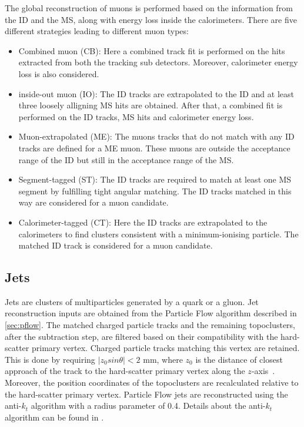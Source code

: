 The global reconstruction of muons is performed based on the information from the ID and the MS, along
with energy loss inside the calorimeters. There are five different strategies leading to different
muon types:
\begin{itemize}
    \item Combined muon (CB): Here a combined track fit is performed on the hits extracted from both
    the tracking sub detectors. Moreover, calorimeter energy loss is also considered. 
    \item inside-out muon (IO): The ID tracks are extrapolated to the ID and at least three loosely
    alligning MS hits are obtained. After that, a combined fit is performed on the ID tracks, MS hits
    and calorimeter energy loss. 
    \item Muon-extrapolated (ME): The muons tracks that do not match with any ID tracks are defined for
    a ME muon. These muons are outside the acceptance range of the ID but still in the acceptance range of the
    MS. 
    \item Segment-tagged (ST): The ID tracks are required to match at least one MS segment by fulfilling
    tight angular matching. The ID tracks matched in this way are considered for a muon candidate.
    \item Calorimeter-tagged (CT): Here the ID tracks are extrapolated to the calorimeters to find
    clusters consistent with a minimum-ionising particle. The matched ID track is considered for a 
    muon candidate. 
\end{itemize}


\subsection*{Jets}
Jets are clusters of multiparticles generated by a quark or a gluon.
Jet reconstruction inputs are obtained from the Particle Flow algorithm described in \cref{sec:pflow}. The
matched charged particle tracks and the remaining topoclusters, after the subtraction step, are 
filtered based on their compatibility with the hard-scatter primary vertex. Charged particle 
tracks matching this vertex are retained. This is done by requiring $|z_0 sin\theta|<2$ mm, 
where $z_0$ is the distance of closest approach of the track to the hard-scatter primary vertex 
along the $z$-axis~\cite{PERF-2015-09}. Moreover, the position coordinates of the topoclusters are recalculated 
relative to the hard-scatter primary vertex. Particle Flow jets are reconstructed using the 
anti-$k_t$ algorithm with a radius parameter of 0.4. Details about the anti-$k_t$ algorithm 
can be found in \cite{Cacciari:2008gp}.

